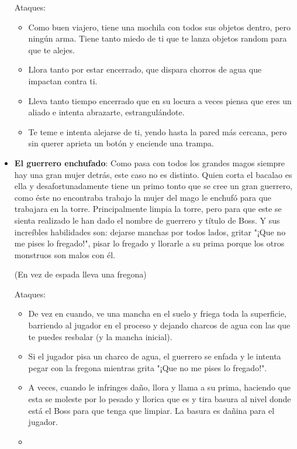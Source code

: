 \begin{itemize}
    Ataques:
    \begin{itemize}
        \item Como buen viajero, tiene una mochila con todos sus objetos dentro, pero ningún arma. Tiene tanto miedo de ti que te lanza objetos random para que te alejes.
        \item Llora tanto por estar encerrado, que dispara chorros de agua que impactan contra ti.
        \item Lleva tanto tiempo encerrado que en su locura a veces piensa que eres un aliado e intenta abrazarte, estrangulándote.
        \item Te teme e intenta alejarse de ti, yendo hasta la pared más cercana, pero sin querer aprieta un botón y enciende una trampa.
    \end{itemize}

    \item \textbf{El guerrero enchufado}: Como pasa con todos los grandes magos siempre hay una gran mujer detrás, este caso no es distinto. Quien corta el bacalao es ella y desafortunadamente tiene un primo tonto que se cree un gran guerrero, como éste no encontraba trabajo la mujer del mago le enchufó para que trabajara en la torre. Principalmente limpia la torre, pero para que este se sienta realizado le han dado el nombre de guerrero y título de Boss. Y sus increíbles habilidades son: dejarse manchas por todos lados, gritar "¡Que no me pises lo fregado!", pisar lo fregado y llorarle a su prima porque los otros monstruos son malos con él.
    
    (En vez de espada lleva una fregona)
    
    Ataques:
    \begin{itemize}
        \item De vez en cuando, ve una mancha en el suelo y friega toda la superficie, barriendo al jugador en el proceso y dejando charcos de agua con las que te puedes resbalar (y la mancha inicial).
        \item Si el jugador pisa un charco de agua, el guerrero se enfada y le intenta pegar con la fregona mientras grita "¡Que no me pises lo fregado!".
        \item A veces, cuando le infringes daño, llora y llama a su prima, haciendo que esta se moleste por lo pesado y llorica que es y tira basura al nivel donde está el Boss para que tenga que limpiar. La basura es dañina para el jugador.
        \item 
    \end{itemize}


\end{itemize}
